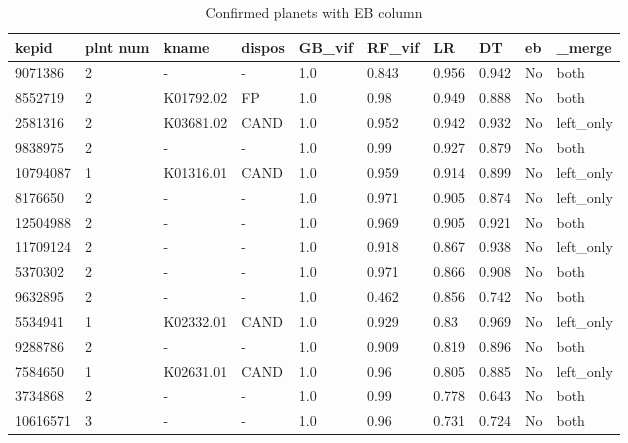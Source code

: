 \begin{table}[!htbp]
 \centering
 \caption{Confirmed planets with EB column}
 \label{dataGBvifRFvifLRDTebtab} 
  \begin{tabular}
{| 
 p{}| 
 p{}| 
 p{}| 
 p{}| 
 p{}| 
 p{}| 
 p{}| 
 p{}| 
 p{}| 
 p{}| 
}\hline 
\textbf{kepid} &\textbf{plnt num} &\textbf{kname} &\textbf{dispos} &\textbf{GB\_vif} &\textbf{RF\_vif} &\textbf{LR} &\textbf{DT} &\textbf{eb} &\textbf{\_merge} \\ \hline 
9071386 &2 &- &- &1.0 &0.843 &0.956 &0.942 &No &both \\ \hline 
8552719 &2 &K01792.02 &FP &1.0 &0.98 &0.949 &0.888 &No &both \\ \hline 
2581316 &2 &K03681.02 &CAND &1.0 &0.952 &0.942 &0.932 &No &left\_only \\ \hline 
9838975 &2 &- &- &1.0 &0.99 &0.927 &0.879 &No &both \\ \hline 
10794087 &1 &K01316.01 &CAND &1.0 &0.959 &0.914 &0.899 &No &left\_only \\ \hline 
8176650 &2 &- &- &1.0 &0.971 &0.905 &0.874 &No &left\_only \\ \hline 
12504988 &2 &- &- &1.0 &0.969 &0.905 &0.921 &No &both \\ \hline 
11709124 &2 &- &- &1.0 &0.918 &0.867 &0.938 &No &left\_only \\ \hline 
5370302 &2 &- &- &1.0 &0.971 &0.866 &0.908 &No &both \\ \hline 
9632895 &2 &- &- &1.0 &0.462 &0.856 &0.742 &No &both \\ \hline 
5534941 &1 &K02332.01 &CAND &1.0 &0.929 &0.83 &0.969 &No &left\_only \\ \hline 
9288786 &2 &- &- &1.0 &0.909 &0.819 &0.896 &No &both \\ \hline 
7584650 &1 &K02631.01 &CAND &1.0 &0.96 &0.805 &0.885 &No &left\_only \\ \hline 
3734868 &2 &- &- &1.0 &0.99 &0.778 &0.643 &No &both \\ \hline 
10616571 &3 &- &- &1.0 &0.96 &0.731 &0.724 &No &both \\ \hline 

\end{tabular}
\end{table}
